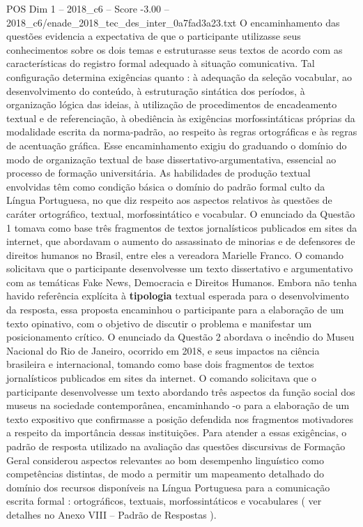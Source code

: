 \begin{textsample}{POS Dim 1 – 2018\_c6 – Score -3.00 – 2018\_c6/enade\_2018\_tec\_des\_inter\_0a7fad3a23.txt}
O encaminhamento das questões evidencia a expectativa de que o participante utilizasse seus conhecimentos sobre os dois temas e estruturasse seus textos de acordo com as características do registro formal adequado à situação comunicativa.
Tal configuração determina exigências quanto : à adequação da seleção vocabular, ao desenvolvimento do conteúdo, à estruturação sintática dos períodos, à organização lógica das ideias, à utilização de procedimentos de encadeamento textual e de referenciação, à obediência às exigências morfossintáticas próprias da modalidade escrita da norma-padrão, ao respeito às regras ortográficas e às regras de acentuação gráfica.
Esse encaminhamento exigiu do graduando o domínio do modo de organização textual de base dissertativo-argumentativa, essencial ao processo de formação universitária.
As habilidades de produção textual envolvidas têm como condição básica o domínio do padrão formal culto da Língua Portuguesa, no que diz respeito aos aspectos relativos às questões de caráter ortográfico, textual, morfossintático e vocabular.
O enunciado da Questão 1 tomava como base três fragmentos de textos jornalísticos publicados em sites da internet, que abordavam o aumento do assassinato de minorias e de defensores de direitos humanos no Brasil, entre eles a vereadora Marielle Franco.
O comando solicitava que o participante desenvolvesse um texto dissertativo e argumentativo com as temáticas Fake News, Democracia e Direitos Humanos.
Embora não tenha havido referência explícita à \textbf{tipologia} textual esperada para o desenvolvimento da resposta, essa proposta encaminhou o participante para a elaboração de um texto opinativo, com o objetivo de discutir o problema e manifestar um posicionamento crítico.
O enunciado da Questão 2 abordava o incêndio do Museu Nacional do Rio de Janeiro, ocorrido em 2018, e seus impactos na ciência brasileira e internacional, tomando como base dois fragmentos de textos jornalísticos publicados em sites da internet.
O comando solicitava que o participante desenvolvesse um texto abordando três aspectos da função social dos museus na sociedade contemporânea, encaminhando -o para a elaboração de um texto expositivo que confirmasse a posição defendida nos fragmentos motivadores a respeito da importância dessas instituições.
Para atender a essas exigências, o padrão de resposta utilizado na avaliação das questões discursivas de Formação Geral considerou aspectos relevantes ao bom desempenho linguístico como competências distintas, de modo a permitir um mapeamento detalhado do domínio dos recursos disponíveis na Língua Portuguesa para a comunicação escrita formal : ortográficos, textuais, morfossintáticos e vocabulares ( ver detalhes no Anexo VIII – Padrão de Respostas ).

\end{textsample}
